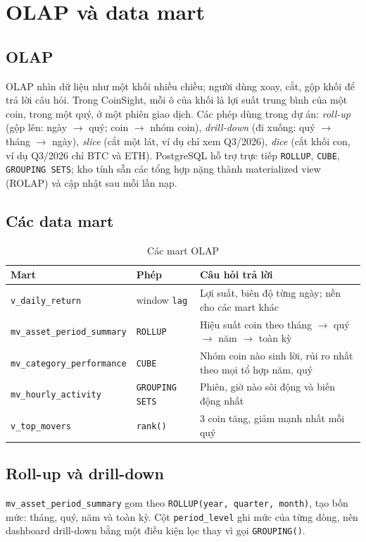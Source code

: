 \documentclass[11pt,a4paper]{article}
\newcommand{\code}[1]{\texttt{#1}}
\begin{document}
\section{OLAP và data mart}\label{sec:olap}

\subsection{OLAP}
OLAP nhìn dữ liệu như một khối nhiều chiều; người dùng xoay, cắt, gộp khối để trả lời câu hỏi.
Trong CoinSight, mỗi ô của khối là lợi suất trung bình của một coin, trong một quý, ở một phiên
giao dịch. Các phép dùng trong dự án: \emph{roll-up} (gộp lên: ngày $\rightarrow$ quý; coin
$\rightarrow$ nhóm coin), \emph{drill-down} (đi xuống: quý $\rightarrow$ tháng $\rightarrow$ ngày),
\emph{slice} (cắt một lát, ví dụ chỉ xem Q3/2026), \emph{dice} (cắt khối con, ví dụ Q3/2026 chỉ BTC
và ETH). PostgreSQL hỗ trợ trực tiếp \code{ROLLUP}, \code{CUBE}, \code{GROUPING SETS}; kho tính sẵn
các tổng hợp nặng thành materialized view (ROLAP) và cập nhật sau mỗi lần nạp.

\subsection{Các data mart}
\begin{table}[H]
\centering\small
\begin{tabularx}{\linewidth}{llX}
\toprule
\textbf{Mart} & \textbf{Phép} & \textbf{Câu hỏi trả lời} \\
\midrule
\code{v\_daily\_return} & window \code{lag} & Lợi suất, biên độ từng ngày; nền cho các mart khác \\
\code{mv\_asset\_period\_summary} & \code{ROLLUP} & Hiệu suất coin theo tháng $\rightarrow$ quý $\rightarrow$ năm $\rightarrow$ toàn kỳ \\
\code{mv\_category\_performance} & \code{CUBE} & Nhóm coin nào sinh lời, rủi ro nhất theo mọi tổ hợp năm, quý \\
\code{mv\_hourly\_activity} & \code{GROUPING SETS} & Phiên, giờ nào sôi động và biến động nhất \\
\code{v\_top\_movers} & \code{rank()} & 3 coin tăng, giảm mạnh nhất mỗi quý \\
\bottomrule
\end{tabularx}
\caption{Các mart OLAP}
\end{table}

\subsection{Roll-up và drill-down}
\code{mv\_asset\_period\_summary} gom theo \code{ROLLUP(year, quarter, month)}, tạo bốn mức: tháng,
quý, năm và toàn kỳ. Cột \code{period\_level} ghi mức của từng dòng, nên dashboard drill-down
bằng một điều kiện lọc thay vì gọi \code{GROUPING()}.
\end{document}
